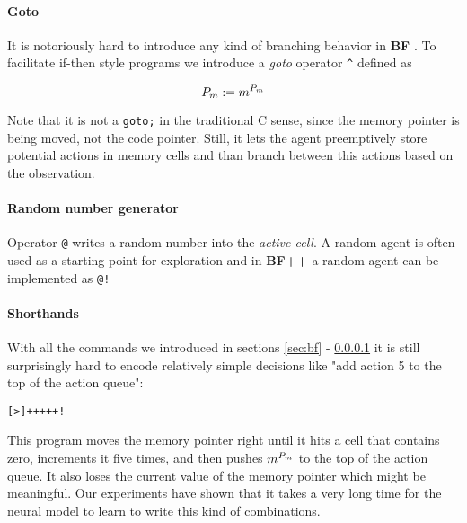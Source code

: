 \paragraph{Goto}
\label{sec:goto}

It is notoriously hard to introduce any kind of branching behavior in \textbf{BF} \cite{linanderControlFlowBrainfuck2016}.
To facilitate if-then style programs we introduce a \textit{goto} operator \verb|^| defined as 

\begin{equation}
   P_m := m^{P_m} 
\end{equation}

Note that it is not a \texttt{goto;} in the traditional C sense, since the memory pointer is being moved, not the code pointer.
Still, it lets the agent preemptively store potential actions in memory cells and than branch between this actions based on the observation.

\paragraph{Random number generator}
\label{sec:random}

Operator \texttt{@} writes a random number into the \textit{active cell}.
A random agent is often used as a starting point for exploration and in \textbf{BF++} a random agent can be implemented as \verb|@!|

\paragraph{Shorthands}
\label{sec:shorthands}

With all the commands we introduced in sections \ref{sec:bf} - \ref{sec:goto} it is still surprisingly hard to encode relatively simple decisions like "add action 5 to the top of the action queue":

\begin{center}
\begin{lstlisting}
[>]+++++!
\end{lstlisting}
\end{center}

This program moves the memory pointer right until it hits a cell that contains zero, increments it five times, and then pushes $m^{P_m}$ to the top of the action queue. It also loses the current value of the memory pointer which might be meaningful. Our experiments have shown that it takes a very long time for the neural model to learn to write this kind of combinations.

